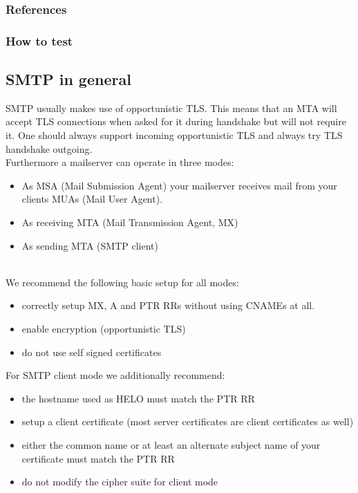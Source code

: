 \subsubsection{References}

\subsubsection{How to test}






\subsection{SMTP in general}
\label{subsection:smtp_general}

SMTP usually makes use of opportunistic TLS. This means that an MTA will accept TLS connections when asked for it during handshake but will not require it. One should always support incoming opportunistic TLS and always try TLS handshake outgoing.\\

Furthermore a mailserver can operate in three modes:
\begin{itemize}
\item As MSA (Mail Submission Agent) your mailserver receives mail from your clients MUAs (Mail User Agent).
\item As receiving MTA (Mail Transmission Agent, MX)
\item As sending MTA (SMTP client)
\end{itemize}
\mbox{}\\
We recommend the following basic setup for all modes:
\begin{itemize}
\item correctly setup MX, A and PTR RRs without using CNAMEs at all.
\item enable encryption (opportunistic TLS)
\item do not use self signed certificates
\end{itemize}

For SMTP client mode we additionally recommend:
\begin{itemize}
\item the hostname used as HELO must match the PTR RR
\item setup a client certificate (most server certificates are client certificates as well)
\item either the common name or at least an alternate subject name of your certificate must match the PTR RR
\item do not modify the cipher suite for client mode
\end{itemize}

